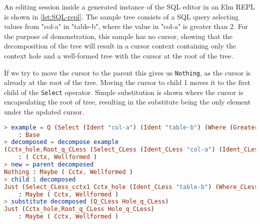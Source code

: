 \documentclass[sigplan]{acmart}
\begin{document}
\begin{example}\label{ex:sql-repl}
An editing session inside a generated instance of the SQL editor in an Elm REPL is
shown in \cref{lst:SQL-repl}.
The sample tree consists of a SQL query
selecting values from "col-a" in "table-b", where the value in
"col-a" is greater than 2. For the purpose of demonstration, this sample
has no cursor, showing that the decomposition of the tree will result in a
cursor context containing only the context hole and a well-formed tree
with the cursor at the root of the tree.

If we try to move the cursor to the parent this gives us
\texttt{Nothing}, as the cursor is already at the root of the
tree. Moving the cursor to child 1 moves it to the first child of the
\texttt{Select} operator. Simple substitution is shown where the
cursor is encapsulating the root of tree, resulting in the substitute
being the only element under the updated cursor.

\vspace{2mm}
\begin{minipage}{\linewidth}
\begin{lstlisting}[style=inline, language=elm, caption={SQL editor session in an Elm REPL}, label={lst:SQL-repl}]
> example = Q (Select (Ident "col-a") (Ident "table-b") (Where (Greater (Eident (Ident "col-a")) (Econst (Num 2)))))
    : Base
> decomposed = decompose example
(Cctx_hole,Root_q_CLess (Select_CLess (Ident_CLess "col-a") (Ident_CLess "table-b") (Where_CLess (Greater_CLess (Eident_CLess (Ident_CLess "col-a")) (Econst_CLess (Num_CLess 2))))))
    : ( Cctx, Wellformed )
> new = parent decomposed
Nothing : Maybe ( Cctx, Wellformed )
> child 1 decomposed
Just (Select_CLess_cctx1 Cctx_hole (Ident_CLess "table-b") (Where_CLess (Greater_CLess (Eident_CLess (Ident_CLess "col-a")) (Econst_CLess (Num_CLess 2)))),Root_id_CLess (Ident_CLess "col-a"))
    : Maybe ( Cctx, Wellformed )
> substitute decomposed (Q_CLess Hole_q_CLess)
Just (Cctx_hole,Root_q_CLess Hole_q_CLess)
    : Maybe ( Cctx, Wellformed )
\end{lstlisting}
\end{minipage}
\vspace{2mm}



\end{example}

\end{document}
